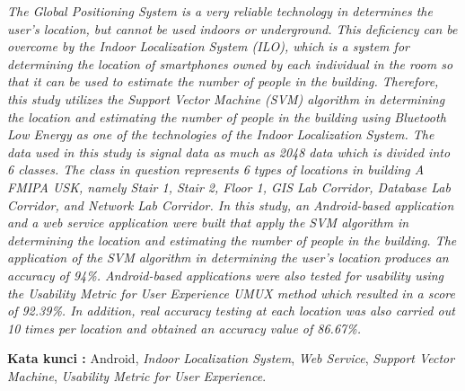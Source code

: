 \begin{abstracteng}

    \textit{The Global Positioning System is a very reliable technology in determines the user's location, but cannot be used indoors or underground. This deficiency can be overcome by the Indoor Localization System (ILO), which is a system for determining the location of smartphones owned by each individual in the room so that it can be used to estimate the number of people in the building. Therefore, this study utilizes the Support Vector Machine (SVM) algorithm in determining the location and estimating the number of people in the building using Bluetooth Low Energy as one of the technologies of the Indoor Localization System. The data used in this study is signal data as much as 2048 data which is divided into 6 classes. The class in question represents 6 types of locations in building A FMIPA USK, namely Stair 1, Stair 2, Floor 1, GIS Lab Corridor, Database Lab Corridor, and Network Lab Corridor. In this study, an Android-based application and a web service application were built that apply the SVM algorithm in determining the location and estimating the number of people in the building. The application of the SVM algorithm in determining the user's location produces an accuracy of 94\%. Android-based applications were also tested for usability using the Usability Metric for User Experience UMUX method which resulted in a score of 92.39\%. In addition, real accuracy testing at each location was also carried out 10 times per location and obtained an accuracy value of 86.67\%.}


    \bigskip
    \noindent
    \textbf{Kata kunci :} Android, \textit{Indoor Localization System}, \textit{Web Service}, \textit{Support Vector Machine}, \textit{Usability Metric for User Experience}.
\end{abstracteng}